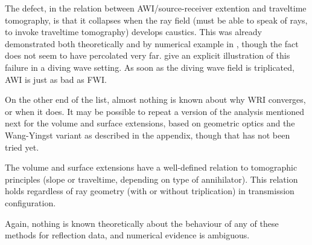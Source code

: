 The defect, in the relation between AWI/source-receiver extention and traveltime tomography, is that it collapses when the ray field (must be able to speak of rays, to invoke traveltime tomography) develops caustics. This was already demonstrated both theoretically and by numerical example in \cite[]{Symes:94c}, though the fact does not seem to have percolated very far. \cite{HuangSymes:17} give an explicit illustration of this failure in a diving wave setting. As soon as the diving wave field is triplicated, AWI is just as bad as FWI.

On the other end of the list, almost nothing is known about why WRI converges, or when it does. It may be possible to repeat a version of the analysis mentioned next for the volume and surface extensions, based on geometric optics and the Wang-Yingst variant as described in the appendix, though that has not been tried yet.

The volume and surface extensions have a well-defined relation to tomographic principles (slope or traveltime, depending on type of annihilator). This relation holds regardless of ray geometry (with or without triplication) in transmission configuration.

Again, nothing is known theoretically about the behaviour of any of these methods for reflection data, and numerical evidence is ambiguous.


%




%
%
%

